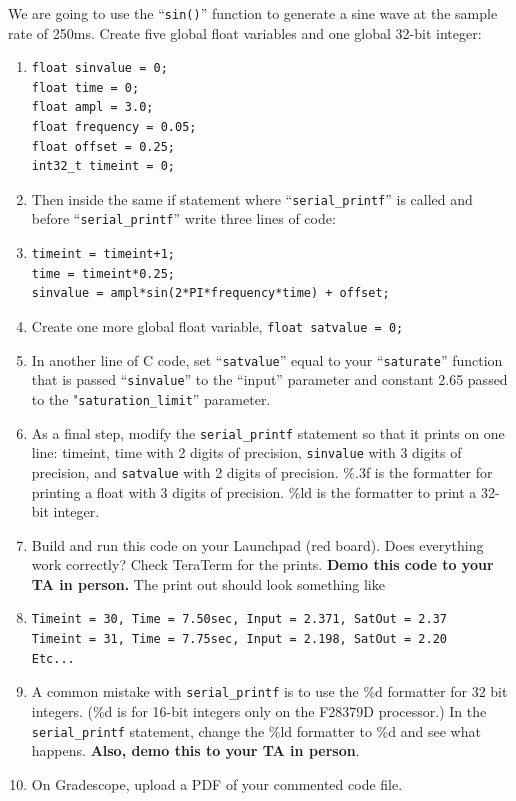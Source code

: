 \documentclass[11pt]{article}
\begin{document}
We are going to use the “\texttt{sin()}” function to generate a sine wave at the sample rate of 250ms. Create five global float variables and one global 32-bit integer:
%
\begin{enumerate}
    \item
\begin{verbatim}
float sinvalue = 0;
float time = 0;
float ampl = 3.0;
float frequency = 0.05;
float offset = 0.25;
int32_t timeint = 0;
\end{verbatim}
    \item Then inside the same if statement where “\texttt{serial\_printf}” is called and before “\texttt{serial\_printf}” write three lines of code:
    \item
\begin{verbatim}
timeint = timeint+1;
time = timeint*0.25;
sinvalue = ampl*sin(2*PI*frequency*time) + offset;
\end{verbatim}
        \item Create one more global float variable, \texttt{float satvalue = 0;}
        \item In another line of C code, set “\verb|satvalue|” equal to your “\verb|saturate|” function that is passed “\verb|sinvalue|” to the “input” parameter and constant 2.65 passed to the "\verb|saturation_limit|” parameter.
        \item As a final step, modify the \texttt{serial\_printf} statement so that it prints on one line: timeint, time with 2 digits of precision, \verb|sinvalue| with 3 digits of precision, and \verb|satvalue| with 2 digits of precision.  \%.3f is the formatter for printing a float with 3 digits of precision. \%ld is the formatter to print a 32-bit integer.
    \item Build and run this code on your Launchpad (red board). Does everything work correctly? Check TeraTerm for the prints. \textbf{Demo this code to your TA in person.} The print out should look something like
    \item
\begin{verbatim}
Timeint = 30, Time = 7.50sec, Input = 2.371, SatOut = 2.37
Timeint = 31, Time = 7.75sec, Input = 2.198, SatOut = 2.20
Etc...
\end{verbatim}
    \item A common mistake with \texttt{serial\_printf} is to use the \%d formatter for 32 bit integers. (\%d is for 16-bit integers only on the F28379D processor.)  In the \texttt{serial\_printf} statement, change the \%ld formatter to \%d and see what happens. \textbf{Also, demo this to your TA in person}.
    \item On Gradescope, upload a PDF of your commented code file.
\end{enumerate}
%
\end{document}
